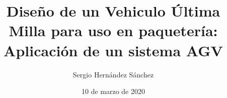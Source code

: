 \usepackage[left=2cm,right=2cm,top=2cm,bottom=2cm]{geometry}
\usepackage[T1]{fontenc}
\usepackage[utf8]{inputenc}
\usepackage[spanish,es-tabla]{babel}
\parindent=0cm %
\usepackage{amsmath}
\usepackage{amssymb}
\usepackage{amsfonts,latexsym,cancel}
\usepackage{array}
\usepackage{float} %
\usepackage{fancyhdr} %
\usepackage{graphicx} %
\usepackage{longtable} %
\usepackage{multicol} %
\usepackage{subfigure} %
\usepackage{anyfontsize}
\usepackage[colorlinks = true, linkcolor = black, citecolor = black, 
            urlcolor = blue]{hyperref}








\author{Sergio Hernández Sánchez}
\title{Diseño de un Vehiculo Última Milla para uso en paquetería: Aplicación de un sistema AGV}

\date{10 de marzo de 2020}